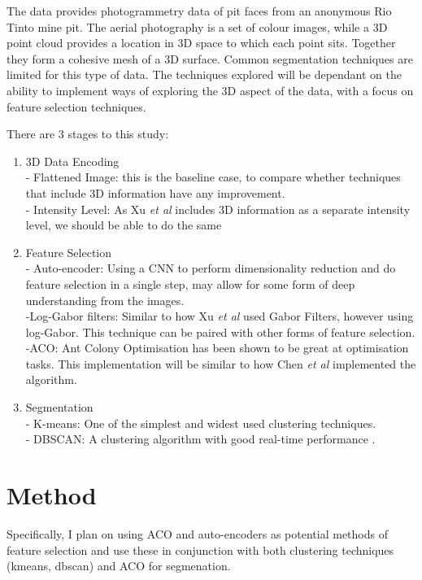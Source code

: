 \documentclass[12pt, a4paper]{article}
\begin{document}
The data provides photogrammetry data of pit faces from an anonymous Rio Tinto mine pit. The aerial photography is a set of colour images, while a 3D point cloud provides a location in 3D space to which each point sits. Together they form a cohesive mesh of a 3D surface. Common segmentation techniques are limited for this type of data. The techniques explored will be dependant on the ability to implement ways of exploring the 3D aspect of the data, with a focus on feature selection techniques.

There are 3 stages to this study:
\begin{enumerate}
\item 3D Data Encoding\\
	- Flattened Image: this is the baseline case, to compare whether techniques that include 3D information have any improvement.\\
	- Intensity Level: As Xu \textit{et al} \cite{xu2009automatic} includes 3D information as a separate intensity level, we should be able to do the same
\item Feature Selection\\
	- Auto-encoder: Using a CNN to perform dimensionality reduction and do feature selection in a single step, may allow for some form of deep understanding from the images.\\
	-Log-Gabor filters: Similar to how Xu \textit{et al} \cite{xu2009automatic} used Gabor Filters, however using log-Gabor. This technique can be paired with other forms of feature selection.\\
	-ACO: Ant Colony Optimisation has been shown to be great at optimisation tasks. This implementation will be similar to how Chen \textit{et al} \cite{chen2013efficient} implemented the algorithm.
\item Segmentation\\
	- K-means: One of the simplest and widest used clustering techniques.\\
	- DBSCAN: A clustering algorithm with good real-time performance \cite{shen2016real}.
\end{enumerate}

\section*{Method}

Specifically, I plan on using ACO and auto-encoders as potential methods of feature selection and use these in conjunction with both clustering techniques (kmeans, dbscan) and ACO for segmenation. 
\end{document}

